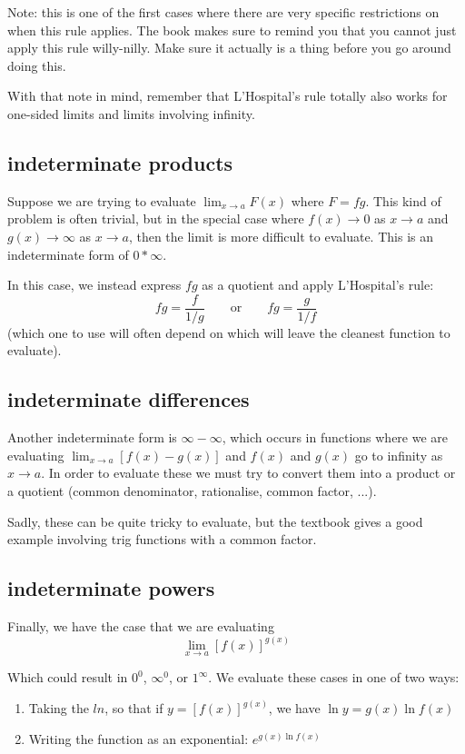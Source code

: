 \documentclass[10pt,a4paper]{report}
\begin{document}
Note: this is one of the first cases where there are very specific restrictions on when this rule applies. The book makes sure to remind you that you cannot just apply this rule willy-nilly. Make sure it actually is a thing before you go around doing this.

With that note in mind, remember that L'Hospital's rule totally also works for one-sided limits and limits involving infinity.

\subsection{indeterminate products}

Suppose we are trying to evaluate $\lim_{x \to a} F(x)$ where $F = fg$. This kind of problem is often trivial, but in the special case where $f(x) \to 0$ as $x \to a$ and $g(x) \to \infty$ as $x \to a$, then the limit is more difficult to evaluate. This is an indeterminate form of $0 * \infty$.

In this case, we instead express $fg$ as a quotient and apply L'Hospital's rule:
$$
	fg = \frac{f}{1/g} \qquad \text{or} \qquad fg = \frac{g}{1/f}
$$
(which one to use will often depend on which will leave the cleanest function to evaluate).

\subsection{indeterminate differences}

Another indeterminate form is $\infty - \infty$, which occurs in functions where we are evaluating $\lim_{x \to a} [f(x) - g(x)]$ and $f(x)$ and $g(x)$ go to infinity as $x \to a$. In order to evaluate these we must try to convert them into a product or a quotient (common denominator, rationalise, common factor, ...).

Sadly, these can be quite tricky to evaluate, but the textbook gives a good example involving trig functions with a common factor.

\subsection{indeterminate powers}

Finally, we have the case that we are evaluating
$$
	\lim_{x \to a} [f(x)]^{g(x)}
$$

Which could result in $0^0$, $\infty^0$, or $1^\infty$. We evaluate these cases in one of two ways:

\begin{enumerate}
	\item Taking the $ln$, so that if $y = [f(x)]^{g(x)}$, we have $\ln y = g(x) \ln f(x)$
	\item Writing the function as an exponential: $e^{g(x) \ln f(x)}$
\end{enumerate}
\end{document}
